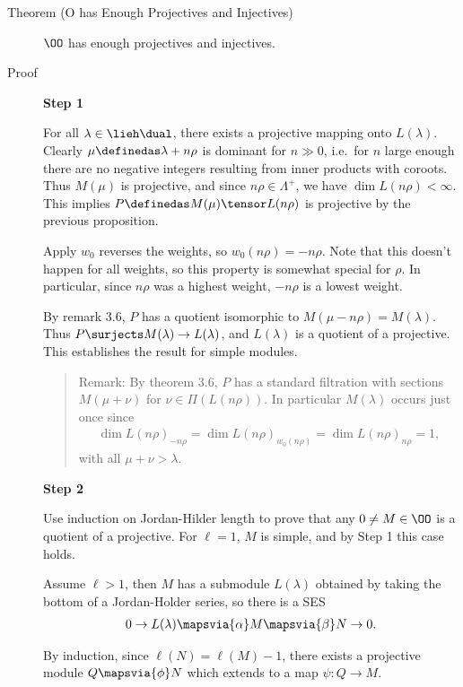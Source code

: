 \begin{description}
\item[Theorem (O has Enough Projectives and Injectives)]
\(\OO\) has enough projectives and injectives.
\item[Proof]
\textbf{Step 1}

For all \(\lambda \in \lieh\dual\), there exists a projective mapping
onto \(L(\lambda)\). Clearly \(\mu \definedas \lambda + n\rho\) is
dominant for \(n\gg 0\), i.e.~for \(n\) large enough there are no
negative integers resulting from inner products with coroots. Thus
\(M(\mu)\) is projective, and since \(n\rho \in \Lambda^+\), we have
\(\dim L(n\rho) < \infty\). This implies
\(P \definedas M(\mu) \tensor L(n\rho)\) is projective by the previous
proposition.

Apply \(w_0\) reverses the weights, so \(w_0(n\rho) = -n\rho\). Note
that this doesn't happen for all weights, so this property is somewhat
special for \(\rho\). In particular, since \(n\rho\) was a highest
weight, \(-n\rho\) is a lowest weight.

By remark 3.6, \(P\) has a quotient isomorphic to
\(M(\mu - n\rho) = M(\lambda)\). Thus
\(P \surjects M(\lambda) \to L(\lambda)\), and \(L(\lambda)\) is a
quotient of a projective. This establishes the result for simple
modules.

\begin{quote}
Remark: By theorem 3.6, \(P\) has a standard filtration with sections
\(M(\mu + \nu)\) for \(\nu \in \Pi(L(n\rho))\). In particular
\(M(\lambda)\) occurs just once since
\begin{align*}\dim L(n\rho)_{-n\rho} = \dim L(n\rho)_{w_0(n\rho)} = \dim L(n\rho)_{n\rho} = 1,\end{align*}
with all \(\mu + \nu > \lambda\).
\end{quote}

\textbf{Step 2}

Use induction on Jordan-Hilder length to prove that any
\(0\neq M\in \OO\) is a quotient of a projective. For \(\ell = 1\),
\(M\) is simple, and by Step 1 this case holds.

Assume \(\ell > 1\), then \(M\) has a submodule \(L(\lambda)\) obtained
by taking the bottom of a Jordan-Holder series, so there is a SES
\begin{align*}0 \to L(\lambda) \mapsvia{\alpha} M \mapsvia{\beta} N \to 0.\end{align*}

By induction, since \(\ell(N) = \ell(M) - 1\), there exists a projective
module \(Q \mapsvia{\phi} N\) which extends to a map \(\psi: Q \to M\).


\end{description}

